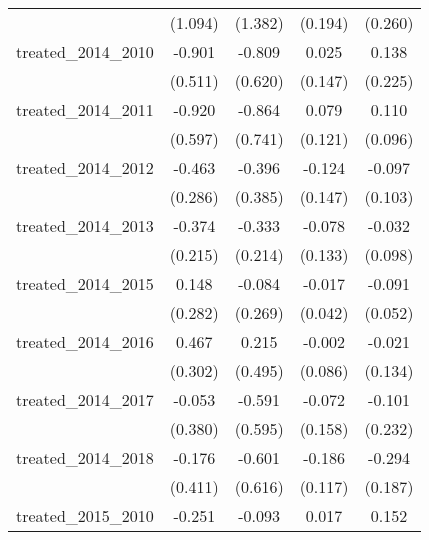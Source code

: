 {\begin{tabular}{l*{4}{c}}
            &     (1.094)         &     (1.382)         &     (0.194)         &     (0.260)         \\
[1em]
treated\_2014\_2010&      -0.901         &      -0.809         &       0.025         &       0.138         \\
            &     (0.511)         &     (0.620)         &     (0.147)         &     (0.225)         \\
[1em]
treated\_2014\_2011&      -0.920         &      -0.864         &       0.079         &       0.110         \\
            &     (0.597)         &     (0.741)         &     (0.121)         &     (0.096)         \\
[1em]
treated\_2014\_2012&      -0.463         &      -0.396         &      -0.124         &      -0.097         \\
            &     (0.286)         &     (0.385)         &     (0.147)         &     (0.103)         \\
[1em]
treated\_2014\_2013&      -0.374         &      -0.333         &      -0.078         &      -0.032         \\
            &     (0.215)         &     (0.214)         &     (0.133)         &     (0.098)         \\
[1em]
treated\_2014\_2015&       0.148         &      -0.084         &      -0.017         &      -0.091         \\
            &     (0.282)         &     (0.269)         &     (0.042)         &     (0.052)         \\
[1em]
treated\_2014\_2016&       0.467         &       0.215         &      -0.002         &      -0.021         \\
            &     (0.302)         &     (0.495)         &     (0.086)         &     (0.134)         \\
[1em]
treated\_2014\_2017&      -0.053         &      -0.591         &      -0.072         &      -0.101         \\
            &     (0.380)         &     (0.595)         &     (0.158)         &     (0.232)         \\
[1em]
treated\_2014\_2018&      -0.176         &      -0.601         &      -0.186         &      -0.294         \\
            &     (0.411)         &     (0.616)         &     (0.117)         &     (0.187)         \\
[1em]
treated\_2015\_2010&      -0.251         &      -0.093         &       0.017         &       0.152         \\

\end{tabular}}
